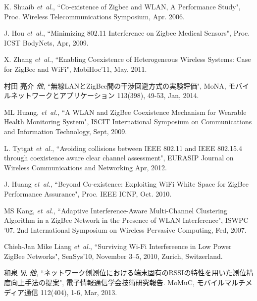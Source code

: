 \documentclass[technicalreport]{ieicej}
\begin{document}
\begin{thebibliography}{99}

K. Shuaib  \textit{et~al.},
``Co-existence of Zigbee and WLAN, A Performance Study", 
Proc. Wireless Telecommunications Symposium, 
Apr. 2006.

J. Hou \textit{et~al.},
``Minimizing 802.11 Interference on Zigbee Medical Sensors", 
Proc. ICST BodyNets,
Apr, 2009.

X. Zhang \textit{et~al.},
``Enabling Coexistence of Heterogeneous Wireless Systems: Case for ZigBee and WiFi", 
MobiHoc’11, May, 2011.

村田 亮介 \textit{他},
``無線LANとZigBee間の干渉回避方式の実験評価", 
MoNA, モバイルネットワークとアプリケーション 113(398), 49-53, 
Jan, 2014.


ML Huang, \textit{et~al.},
``A WLAN and ZigBee Coexistence Mechanism for Wearable Health Monitoring System", 
ISCIT International Symposium on Communications and Information Technology, Sept, 2009.

L. Tytgat \textit{et~al.},
``Avoiding collisions between IEEE 802.11 and IEEE 802.15.4 through coexistence aware clear channel assessment", 
EURASIP Journal on Wireless Communications and Networking
Apr, 2012.

J. Huang \textit{et~al.},
``Beyond Co-existence: Exploiting WiFi White Space for ZigBee Performance Assurance", 
Proc. IEEE ICNP,
Oct. 2010.

MS Kang, \textit{et~al.},
``Adaptive Interference-Aware Multi-Channel Clustering Algorithm in a ZigBee Network in the Presence of WLAN Interference", 
ISWPC '07. 2nd International Symposium on Wireless Pervasive Computing, Fed, 2007.

Chieh-Jan Mike Liang \textit{et~al.},
``Surviving Wi-Fi Interfereence in Low Power ZigBee Networks", 
SenSys’10, 
November 3–5, 2010, 
Zurich, Switzerland.

和泉 晃 \textit{他},
``ネットワーク側測位における端末固有のRSSIの特性を用いた測位精度向上手法の提案", 
電子情報通信学会技術研究報告. MoMuC, モバイルマルチメディア通信 112(404), 1-6, Mar, 2013. 


\end{thebibliography}
\end{document}

